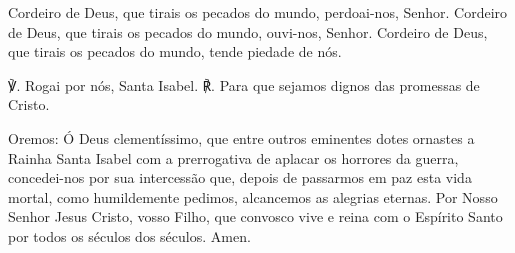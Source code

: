 Cordeiro de Deus, que tirais os pecados do mundo, perdoai-nos, Senhor.
Cordeiro de Deus, que tirais os pecados do mundo, ouvi-nos, Senhor.
Cordeiro de Deus, que tirais os pecados do mundo, tende piedade de nós.

℣. Rogai por nós, Santa Isabel.
℟. Para que sejamos dignos das promessas de Cristo.

Oremos:
Ó Deus clementíssimo, que entre outros eminentes dotes ornastes a Rainha Santa Isabel com a prerrogativa de aplacar os horrores da guerra, concedei-nos por sua intercessão que, depois de passarmos em paz esta vida mortal, como humildemente pedimos, alcancemos as alegrias eternas. Por Nosso Senhor Jesus Cristo, vosso Filho, que convosco vive e reina com o Espírito Santo por todos os séculos dos séculos.
Amen.
